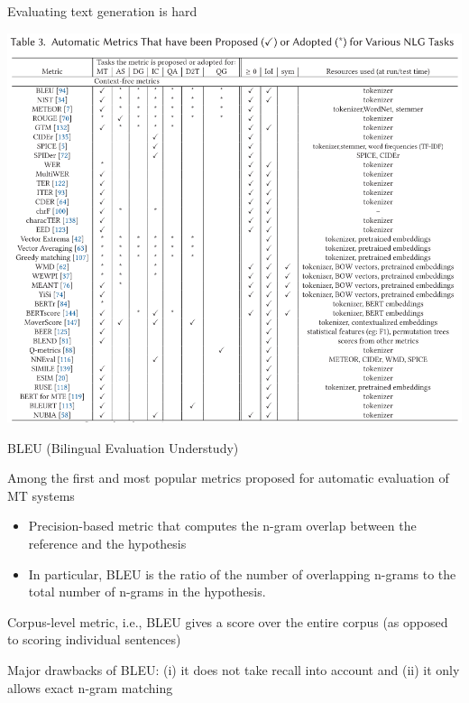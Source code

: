 \documentclass[12pt,aspectratio=169,handout]{beamer}
\begin{document}
\begin{frame}{Evaluating text generation is hard}
	
\includegraphics[width=1.0\linewidth]{img/nlg2.png}
	
\end{frame}


\begin{frame}{BLEU (Bilingual Evaluation Understudy)}

Among the first and most popular metrics proposed for automatic evaluation of MT systems

\begin{itemize}
	\item Precision-based metric that computes the n-gram overlap between the reference and the hypothesis
	\item In particular, BLEU is the ratio of the number of overlapping n-grams to the total number of n-grams in the hypothesis.
\end{itemize}


Corpus-level metric, i.e., BLEU gives a score over the entire corpus (as opposed to scoring individual sentences)

Major drawbacks of BLEU: (i) it does not take recall into account and (ii) it only allows exact n-gram matching


\end{frame}
\end{document}
